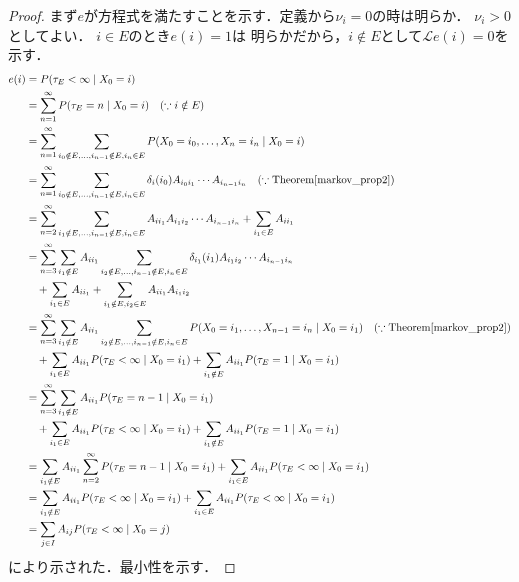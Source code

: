 \documentclass[dvipdfmx,autodetect-engine]{jsarticle}
\theoremstyle{remark}
\theoremstyle{definition}
\begin{document}
\begin{proof}
    まず$e$が方程式を満たすことを示す．定義から$\nu_i =0$の時は明らか．
    $\nu_i >0$としてよい．
    $i \in E$のとき$e(i)=1$は
    明らかだから，$i \notin E$として$\mathcal{L}e(i)=0$を示す．
    \begin{align}
        e(i) &= P(\tau_{E}<\infty \mid X_0 = i) \\
        &= \sum_{n=1}^{\infty} P(\tau_{E} = n \mid X_0 = i) \quad (\because i \notin E)\\
        &= \sum_{n=1}^{\infty} \sum_{i_0 \notin E,\ldots,i_{n-1}\notin E,i_n\in E} 
        P(X_0 = i_0,\ldots,X_n = i_n \mid X_0 = i) \\
        &= \sum_{n=1}^{\infty} \sum_{i_0 \notin E,\ldots,i_{n-1}\notin E,i_n\in E} 
        \delta_{i}(i_0)  A_{i_0 i_1}\cdots A_{i_{n-1} i_n} \quad 
        (\because \mathrm{Theorem}\ref{markov_prop2})\\
        &= \sum_{n=2}^{\infty} \sum_{i_1 \notin E,\ldots,i_{n-1}\notin E,i_n\in E} 
         A_{i i_1} A_{i_1 i_2}\cdots A_{i_{n-1} i_n} 
         + \sum_{i_{1} \in E} A_{i i_{1}} \\
        &= \sum_{n=3}^{\infty} \sum_{i_{1} \notin E} A_{i i_{1}} 
        \sum_{i_2 \notin E,\ldots,i_{n-1}\notin E,i_n\in E} 
        \delta_{i_1}(i_1) A_{i_1 i_2}\cdots A_{i_{n-1} i_n} \\
        &\quad + \sum_{i_{1} \in E} A_{i i_{1}} 
        + \sum_{i_{1} \notin E,i_{2} \in E} A_{i i_{1}} A_{i_{1} i_{2}}\\
        &= \sum_{n=3}^{\infty} \sum_{i_{1} \notin E} A_{i i_{1}}
        \sum_{i_2 \notin E,\ldots,i_{n-1}\notin E,i_n\in E} 
        P(X_0 = i_1,\ldots,X_{n-1} = i_n \mid X_0 = i_1) 
        \quad (\because \mathrm{Theorem}\ref{markov_prop2})\\
        &\quad + \sum_{i_{1} \in E} A_{i i_{1}} P(\tau_{E} <\infty \mid X_0 = i_{1})
        + \sum_{i_{1} \notin E} A_{i i_{1}} P(\tau_{E} = 1 \mid X_0 = i_{1})\\
        &= \sum_{n=3}^{\infty} \sum_{i_{1} \notin E} A_{i i_{1}} 
        P(\tau_{E} = n-1 \mid X_0 = i_1) \\
        &\quad + \sum_{i_{1} \in E} A_{i i_{1}} P(\tau_{E} <\infty \mid X_0 = i_{1})
        + \sum_{i_{1} \notin E} A_{i i_{1}} P(\tau_{E} = 1 \mid X_0 = i_{1})\\
        &= \sum_{i_{1} \notin E} A_{i i_{1}} \sum_{n=2}^{\infty} 
        P(\tau_{E} = n-1 \mid X_0 = i_1) 
        + \sum_{i_{1} \in E} A_{i i_{1}} P(\tau_{E} <\infty \mid X_0 = i_{1})\\
        &= \sum_{i_{1} \notin E} A_{i i_{1}} P(\tau_{E} < \infty \mid X_0 = i_{1})
        + \sum_{i_{1} \in E} A_{i i_{1}} P(\tau_{E} <\infty \mid X_0 = i_{1})\\
        &= \sum_{j \in I} A_{i j} P(\tau_{E} < \infty \mid X_0 = j)
    \end{align}
    により示された．最小性を示す．
\end{proof}
\end{document}
